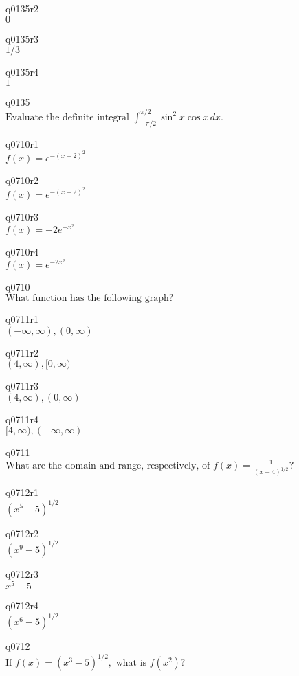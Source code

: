 q0135r2\\
\(\displaystyle 0 \)

q0135r3\\
\(\displaystyle 1/3 \)

q0135r4\\
\(\displaystyle 1 \)

q0135\\
\(\displaystyle \text{Evaluate the definite integral } \int_{-\pi/2}^{\pi/2} \sin^2 x \cos x \, dx. \)

q0710r1\\
\(\displaystyle f(x) = e^{-(x-2)^2} \)

q0710r2\\
\(\displaystyle f(x) = e^{-(x+2)^2} \)

q0710r3\\
\(\displaystyle f(x) = -2e^{-x^2} \)

q0710r4\\
\(\displaystyle f(x) = e^{-2x^2} \)

q0710\\
\(\displaystyle \text{What function has the following graph?} \)

q0711r1\\
\(\displaystyle (-\infty, \infty), (0, \infty) \)

q0711r2\\
\(\displaystyle (4, \infty), [0, \infty) \)

q0711r3\\
\(\displaystyle (4, \infty), (0, \infty) \)

q0711r4\\
\(\displaystyle [4, \infty), (-\infty, \infty) \)

q0711\\
\(\displaystyle \text{What are the domain and range, respectively, of } f(x) = \frac{1}{(x-4)^{1/2}}? \)

q0712r1\\
\(\displaystyle (x^5 - 5)^{1/2} \)

q0712r2\\
\(\displaystyle (x^9 - 5)^{1/2} \)

q0712r3\\
\(\displaystyle x^5 - 5 \)

q0712r4\\
\(\displaystyle (x^6 - 5)^{1/2} \)

q0712\\
\(\displaystyle \text{If } f(x) = (x^3 - 5)^{1/2}, \text{ what is } f(x^2)? \)

